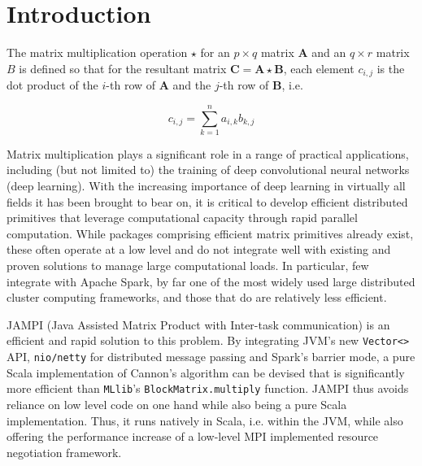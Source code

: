 \documentclass[fleqn,10pt]{SelfArx} %
\affiliation{\textsuperscript{1}\textit{Starschema Inc., Arlington, VA.}} %
\affiliation{*\textbf{Corresponding author}: tfoldi@starschema.net} %
\begin{document}
\maketitle %


\section{Introduction} %
\label{sec:introduction}

The matrix multiplication operation $\star$ for an $p \times q$ matrix $\mathbf{A}$ and an $q \times r$ matrix $B$ is defined so that for the resultant matrix $\mathbf{C} = \mathbf{A} \star \mathbf{B}$, each element $c_{i, j}$ is the dot product of the $i$-th row of $\mathbf{A}$ and the $j$-th row of $\mathbf{B}$, i.e.

$$ c_{i, j} = \sum_{k = 1}^n a_{i, k} b_{k, j} $$

Matrix multiplication plays a significant role in a range of practical applications, including (but not limited to) the training of deep convolutional neural networks (deep learning). With the increasing importance of deep learning in virtually all fields it has been brought to bear on, it is critical to develop efficient distributed primitives that leverage computational capacity through rapid parallel computation. While packages comprising efficient matrix primitives already exist,\cite{chetlur2014cudnn} these often operate at a low level and do not integrate well with existing and proven solutions to manage large computational loads. In particular, few integrate with Apache Spark, by far one of the most widely used large distributed cluster computing frameworks, and those that do are relatively less efficient. 

JAMPI (Java Assisted Matrix Product with Inter-task communication) is an efficient and rapid solution to this problem. By integrating JVM's new \texttt{Vector<>} API, \texttt{nio/netty} for distributed message passing and Spark's barrier mode, a pure Scala implementation of Cannon's algorithm can be devised that is significantly more efficient than \texttt{MLlib}'s \texttt{BlockMatrix.multiply} function. JAMPI thus avoids reliance on low level code on one hand while also being a pure Scala implementation. Thus, it runs natively in Scala, i.e. within the JVM, while also offering the performance increase of a low-level MPI implemented resource negotiation framework.
\end{document}
